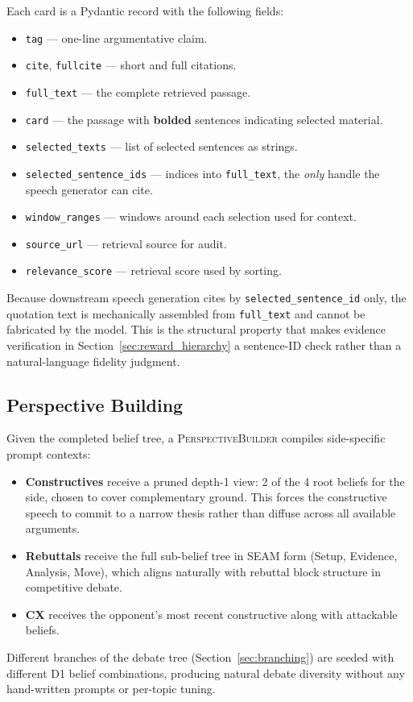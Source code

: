 Each card is a Pydantic record with the following fields:
\begin{itemize}
    \item \texttt{tag} --- one-line argumentative claim.
    \item \texttt{cite}, \texttt{fullcite} --- short and full citations.
    \item \texttt{full\_text} --- the complete retrieved passage.
    \item \texttt{card} --- the passage with \textbf{bolded} sentences
    indicating selected material.
    \item \texttt{selected\_texts} --- list of selected sentences as
    strings.
    \item \texttt{selected\_sentence\_ids} --- indices into
    \texttt{full\_text}, the \emph{only} handle the speech generator can
    cite.
    \item \texttt{window\_ranges} --- windows around each selection used
    for context.
    \item \texttt{source\_url} --- retrieval source for audit.
    \item \texttt{relevance\_score} --- retrieval score used by sorting.
\end{itemize}
Because downstream speech generation cites by \texttt{selected\_sentence\_id}
only, the quotation text is mechanically assembled from \texttt{full\_text}
and cannot be fabricated by the model. This is the structural property that
makes evidence verification in Section~\ref{sec:reward_hierarchy} a
sentence-ID check rather than a natural-language fidelity judgment.

\subsection{Perspective Building}

Given the completed belief tree, a \textsc{PerspectiveBuilder} compiles
side-specific prompt contexts:
\begin{itemize}
    \item \textbf{Constructives} receive a pruned depth-1 view: 2 of the
    4 root beliefs for the side, chosen to cover complementary ground.
    This forces the constructive speech to commit to a narrow thesis
    rather than diffuse across all available arguments.
    \item \textbf{Rebuttals} receive the full sub-belief tree in SEAM
    form (Setup, Evidence, Analysis, Move), which aligns naturally with
    rebuttal block structure in competitive debate.
    \item \textbf{CX} receives the opponent's most recent
    constructive along with attackable beliefs.
\end{itemize}
Different branches of the debate tree (Section~\ref{sec:branching}) are
seeded with different D1 belief combinations, producing natural debate
diversity without any hand-written prompts or per-topic tuning.

